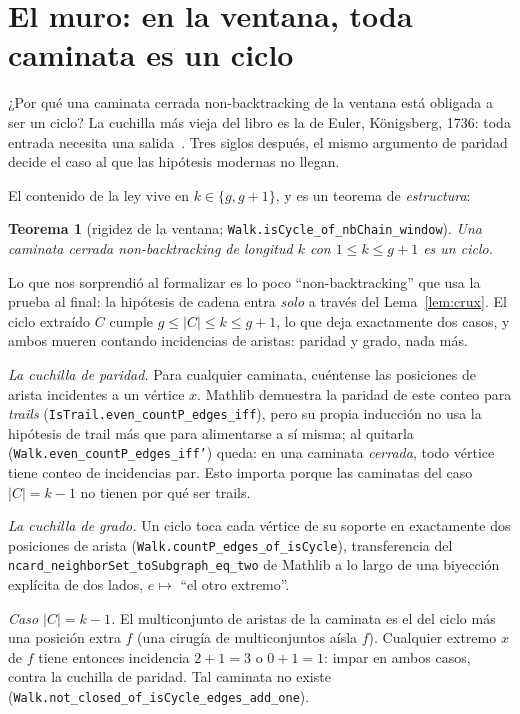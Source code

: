 \documentclass[11pt]{article}
\newtheorem{theorem}{Teorema}
\newcommand{\lean}[1]{\texttt{#1}}
\begin{document}
\section{El muro: en la ventana, toda caminata es un ciclo}
\label{sec:wall}

¿Por qué una caminata cerrada non-backtracking de la ventana está obligada a ser un ciclo?
La cuchilla más vieja del libro es la de Euler, K\"onigsberg, 1736: toda entrada necesita
una salida~\cite{Euler1736}. Tres siglos después, el mismo argumento de paridad decide el
caso al que las hipótesis modernas no llegan.

El contenido de la ley vive en $k \in \{g, g+1\}$, y es un teorema de \emph{estructura}:

\begin{theorem}[rigidez de la ventana; \lean{Walk.isCycle\_of\_nbChain\_window}]
\label{thm:rigidity}
Una caminata cerrada non-backtracking de longitud $k$ con $1 \le k \le g+1$ es un ciclo.
\end{theorem}

Lo que nos sorprendió al formalizar es lo poco ``non-backtracking'' que usa la prueba al
final: la hipótesis de cadena entra \emph{solo} a través del Lema~\ref{lem:crux}. El ciclo
extraído $C$ cumple $g \le |C| \le k \le g+1$, lo que deja exactamente dos casos, y ambos
mueren contando incidencias de aristas: paridad y grado, nada más.

\emph{La cuchilla de paridad.} Para cualquier caminata, cuéntense las posiciones de arista
incidentes a un vértice $x$. Mathlib demuestra la paridad de este conteo para \emph{trails}
(\lean{IsTrail.even\_countP\_edges\_iff}), pero su propia inducción no usa la hipótesis de
trail más que para alimentarse a sí misma; al quitarla
(\lean{Walk.even\_countP\_edges\_iff'}) queda: en una caminata \emph{cerrada}, todo vértice
tiene conteo de incidencias par. Esto importa porque las caminatas del caso $|C| = k-1$ no
tienen por qué ser trails.

\emph{La cuchilla de grado.} Un ciclo toca cada vértice de su soporte en exactamente dos
posiciones de arista (\lean{Walk.countP\_edges\_of\_isCycle}), transferencia del
\lean{ncard\_neighborSet\_toSubgraph\_eq\_two} de Mathlib a lo largo de una biyección
explícita de dos lados, $e \mapsto$ ``el otro extremo''.

\emph{Caso $|C| = k-1$.} El multiconjunto de aristas de la caminata es el del ciclo más una
posición extra $f$ (una cirugía de multiconjuntos aísla $f$). Cualquier extremo $x$ de $f$
tiene entonces incidencia $2 + 1 = 3$ o $0 + 1 = 1$: impar en ambos casos, contra la
cuchilla de paridad. Tal caminata no existe
(\lean{Walk.not\_closed\_of\_isCycle\_edges\_add\_one}).
\end{document}
